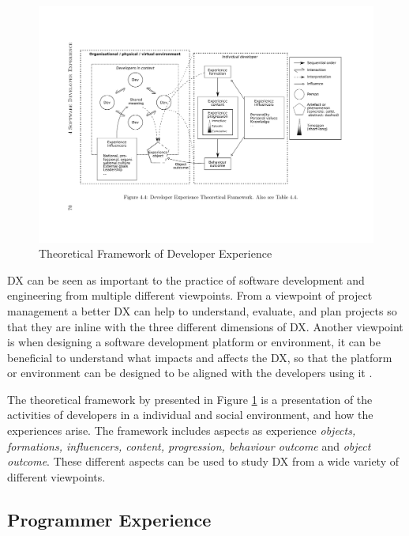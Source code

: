 \documentclass[english, 12pt, a4paper, sci, utf8, a-1b, online]{aaltothesis}
\begin{document}
\begin{figure}[H]
  \captionsetup{width=0.6\textwidth}
  \caption{Theoretical Framework of Developer Experience \parencite{fagerholm-doctoral-thesis}}
  \begin{center}
    \includegraphics[width=\textwidth]{theoretical-framework.pdf}
  \end{center}
  \label{figure:theoretical-framework}
\end{figure}

DX can be seen as important to the practice of software development and engineering from multiple different viewpoints. From a viewpoint of project management a better DX can help to understand, evaluate, and plan projects so that they are inline with the three different dimensions of DX. Another viewpoint is when designing a software development platform or environment, it can be beneficial to understand what impacts and affects the DX, so that the platform or environment can be designed to be aligned with the developers using it \parencite{fagerholm-dx-concept-and-definition}.

The theoretical framework by \textcite{fagerholm-doctoral-thesis} presented in Figure \ref{figure:theoretical-framework} is a presentation of the activities of developers in a individual and social environment, and how the experiences arise. The framework includes aspects as experience \textit{objects, formations, influencers, content, progression, behaviour outcome} and \textit{object outcome}. These different aspects can be used to study DX from a wide variety of different viewpoints.

\subsection{Programmer Experience}
\end{document}
